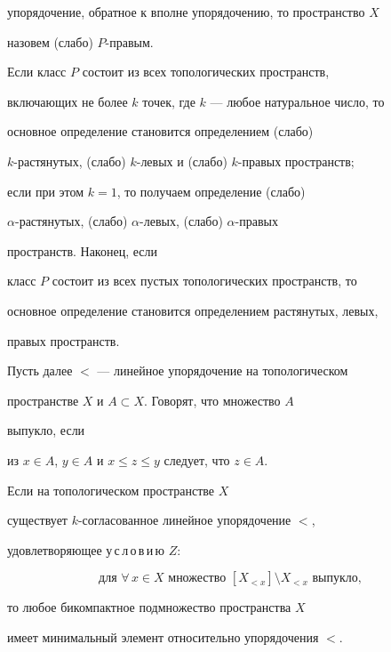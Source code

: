 упорядочение, обратное к вполне упорядочению, то пространство $X$  


назовем (слабо) $P$-правым. 


\medskip 


 


Если класс $P$ состоит из всех топологических пространств,  


включающих не более $k$ точек, где $k$ --- любое натуральное число, то  


основное определение становится определением (слабо) 


$k$-растянутых, (слабо) $k$-левых и (слабо) $k$-правых пространств; 


если при этом $k=1$, то получаем определение (слабо) 


$\alpha$-растянутых, (слабо) $\alpha$-левых, (слабо) $\alpha$-правых 


пространств. Наконец, если 


класс $P$ состоит из всех пустых топологических пространств, то  


основное определение становится определением растянутых, левых,  


правых пространств. 


 


Пусть далее $<$ --- линейное упорядочение на топологическом  


пространстве $X$ и $A\subset X$. Говорят, что множество $A$ 


выпукло, если  


из $x\in A$, $y\in A$ и $x\le z\le y$ следует, что $z\in A$.  


 


\begin{thm} Если на топологическом пространстве $X$ 


существует $k$-согласованное линейное упорядочение $<$,  


удовлетворяющее у\,с\,л\,о\,в\,и\,ю $Z:$


$$


\text{для $\forall\,x\in X$ множество 


$[X_{<x}]\setminus X_{<x}$ выпукло},


$$


то любое бикомпактное подмножество пространства $X$  


имеет минимальный элемент относительно упорядочения $<$. 


\end{thm} 


